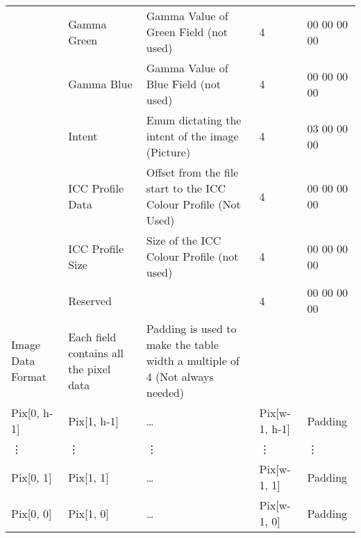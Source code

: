 \begin{center}
\begin{longtable}{|p{2.5cm}|p{2.5cm}|p{4cm}|p{2cm}|p{2cm}|}
	& 	Gamma Green&	Gamma Value of Green Field (not used) & 4 & 00 00 00 00 \\
	& 	Gamma Blue	&	Gamma Value of Blue Field (not used) & 4 & 00 00 00 00 \\
	&	Intent 	& 	Enum dictating the intent of the image (Picture) & 4 & 03 00 00 00 \\
	& 	ICC Profile Data & 	Offset from the file start to the ICC Colour Profile (Not Used) & 4 &  00 00 00 00 \\
	& ICC Profile Size & Size of the ICC Colour Profile (not used)	& 4 & 00 00 00 00 \\
	& Reserved & & 4 & 00 00 00 00 \\
\hline
Image Data Format & Each field contains all the pixel data& Padding is used to make the table width a multiple of 4 (Not always needed) & &\\
 Pix[0, h-1] 	& Pix[1, h-1] 	& \dots & Pix[w-1, h-1] & Padding \\
\vdots & \vdots & \vdots & \vdots & \vdots \\
 Pix[0, 1] 	& Pix[1, 1] 	& \dots & Pix[w-1, 1] & Padding \\
 Pix[0, 0] 	& Pix[1, 0] 	& \dots & Pix[w-1, 0] & Padding 
\end{longtable}
\end{center}